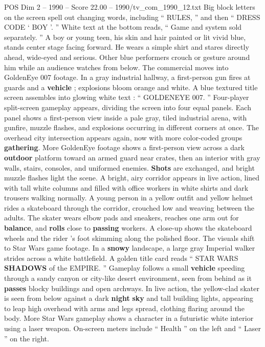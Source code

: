 \begin{textsample}{POS Dim 2 – 1990 – Score 22.00 – 1990/tv\_com\_1990\_12.txt}
Big block letters on the screen spell out changing words, including “ RULES, ” and then “ DRESS CODE ‘ BOY ’. ” White text at the bottom reads, “ Game and system sold separately. ” A boy or young teen, his skin and hair painted or lit vivid blue, stands center stage facing forward.
He wears a simple shirt and stares directly ahead, wide-eyed and serious.
Other blue performers crouch or gesture around him while an audience watches from below.
The commercial moves into GoldenEye 007 footage.
In a gray industrial hallway, a first-person gun fires at guards and a \textbf{vehicle} ; explosions bloom orange and white.
A blue textured title screen assembles into glowing white text : “ GOLDENEYE 007. ” Four-player split-screen gameplay appears, dividing the screen into four equal panels.
Each panel shows a first-person view inside a pale gray, tiled industrial arena, with gunfire, muzzle flashes, and explosions occurring in different corners at once.
The overhead city intersection appears again, now with more color-coded groups \textbf{gathering}.
More GoldenEye footage shows a first-person view across a dark \textbf{outdoor} platform toward an armed guard near crates, then an interior with gray walls, stairs, consoles, and uniformed enemies. \textbf{Shots} are exchanged, and bright muzzle flashes light the scene.
A bright, airy corridor appears in live action, lined with tall white columns and filled with office workers in white shirts and dark trousers walking normally.
A young person in a yellow outfit and yellow helmet rides a skateboard through the corridor, crouched low and weaving between the adults.
The skater wears elbow pads and sneakers, reaches one arm out for \textbf{balance}, and \textbf{rolls} close to \textbf{passing} workers.
A close-up shows the skateboard wheels and the rider ’s foot skimming along the polished floor.
The visuals shift to Star Wars game footage.
In a \textbf{snowy} landscape, a large gray Imperial walker strides across a white battlefield.
A golden title card reads “ STAR WARS \textbf{SHADOWS} of the EMPIRE. ” Gameplay follows a small \textbf{vehicle} speeding through a sandy canyon or city-like desert environment, seen from behind as it \textbf{passes} blocky buildings and open archways.
In live action, the yellow-clad skater is seen from below against a dark \textbf{night} \textbf{sky} and tall building lights, appearing to leap high overhead with arms and legs spread, clothing flaring around the body.
More Star Wars gameplay shows a character in a futuristic white interior using a laser weapon.
On-screen meters include “ Health ” on the left and “ Laser ” on the right.

\end{textsample}
